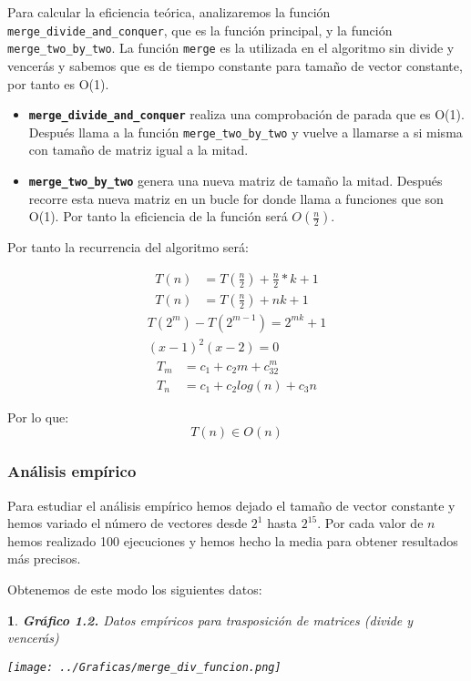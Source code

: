 \documentclass[10pt, a4paper]{article}
\theoremstyle{theorem-style}
\newtheorem*{datos}{}
\theoremstyle{theorem-style}
\theoremstyle{definition-style}
\theoremstyle{remark-style}
\theoremstyle{example-style}
\theoremstyle{definition-style}
\theoremstyle{remark-style}
\begin{document}
Para calcular la eficiencia teórica, analizaremos la función \texttt{merge\_divide\_and\_conquer}, que es la función principal, y la función \texttt{merge\_two\_by\_two}. La función \texttt{merge} es la utilizada en el algoritmo sin divide y vencerás y sabemos que es de tiempo constante para tamaño de vector constante, por tanto es O(1). 
\begin{itemize}
	\item \textbf{\texttt{merge\_divide\_and\_conquer}} realiza una comprobación de parada que es O(1). Después llama a la función \texttt{merge\_two\_by\_two} y vuelve a llamarse a si misma con tamaño de matriz igual a la mitad.
	\item \textbf{\texttt{merge\_two\_by\_two}} genera una nueva matriz de tamaño la mitad. Después recorre esta nueva matriz en un bucle for donde llama a funciones que son O(1). Por tanto la eficiencia de la función será $O\left(\frac{n}{2}\right)$.
\end{itemize}
Por tanto la recurrencia del algoritmo será:

\begin{align*}
T(n) &= T\left(\frac{n}{2}\right)+\frac{n}{2}*k+1\\
T(n) &= T\left(\frac{n}{2}\right) + nk +1
\end{align*}
\begin{align*}
T(2^m) - T(2^{m-1}) = 2^{mk}+1 \\
(x-1)^2(x-2) = 0
\end{align*}
\begin{align*}
T_m &= c_1 + c_2m +c_32^m \\
T_n &= c_1 + c_2log(n) + c_3n
\end{align*}

Por lo que:
$$T(n) \in O(n)$$

\pagebreak

\subsubsection{Análisis empírico}

Para estudiar el análisis empírico hemos dejado el tamaño de vector constante y hemos variado el número de vectores desde $2^1$ hasta $2^{15}$. Por cada valor de $n$ hemos realizado 100 ejecuciones y hemos hecho la media para obtener resultados más precisos.

Obtenemos de este modo los siguientes datos:

\begin{datos}
	{\bf\sffamily Gráfico 1.2.} {\sffamily Datos empíricos para trasposición de matrices (divide y vencerás)}\\
	\vspace{-0.7cm}
	\begin{center}
		\texttt{[image: ../Graficas/merge\_div\_funcion.png]}
	\end{center}	
\end{datos}
\end{document}
